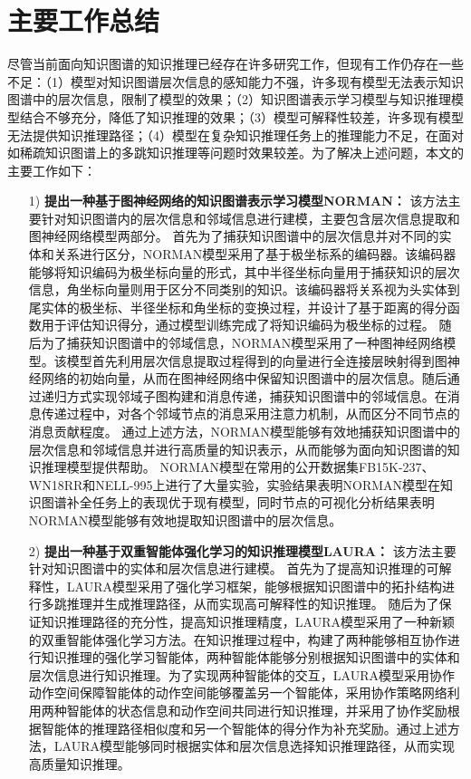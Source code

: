 \documentclass[algorithmlist, AutoFakeBold, AutoFakeSlant, figurelist, tablelist, nomlist, engineering, openany]{seuthesix} %
\begin{document}
\section{主要工作总结}
尽管当前面向知识图谱的知识推理已经存在许多研究工作，但现有工作仍存在一些不足：（1）模型对知识图谱层次信息的感知能力不强，许多现有模型无法表示知识图谱中的层次信息，限制了模型的效果；（2）知识图谱表示学习模型与知识推理模型结合不够充分，降低了知识推理的效果；（3）模型可解释性较差，许多现有模型无法提供知识推理路径；（4）模型在复杂知识推理任务上的推理能力不足，在面对如稀疏知识图谱上的多跳知识推理等问题时效果较差。为了解决上述问题，本文的主要工作如下：
\begin{itemize}
  \item [1)]\textbf{提出一种基于图神经网络的知识图谱表示学习模型NORMAN：}
  该方法主要针对知识图谱内的层次信息和邻域信息进行建模，主要包含层次信息提取和图神经网络模型两部分。
  首先为了捕获知识图谱中的层次信息并对不同的实体和关系进行区分，NORMAN模型采用了基于极坐标系的编码器。该编码器能够将知识编码为极坐标向量的形式，其中半径坐标向量用于捕获知识的层次信息，角坐标向量则用于区分不同类别的知识。该编码器将关系视为头实体到尾实体的极坐标、半径坐标和角坐标的变换过程，并设计了基于距离的得分函数用于评估知识得分，通过模型训练完成了将知识编码为极坐标的过程。
  随后为了捕获知识图谱中的邻域信息，NORMAN模型采用了一种图神经网络模型。该模型首先利用层次信息提取过程得到的向量进行全连接层映射得到图神经网络的初始向量，从而在图神经网络中保留知识图谱中的层次信息。随后通过递归方式实现邻域子图构建和消息传递，捕获知识图谱中的邻域信息。在消息传递过程中，对各个邻域节点的消息采用注意力机制，从而区分不同节点的消息贡献程度。
  通过上述方法，NORMAN模型能够有效地捕获知识图谱中的层次信息和邻域信息并进行高质量的知识表示，从而能够为面向知识图谱的知识推理模型提供帮助。
  NORMAN模型在常用的公开数据集FB15K-237、WN18RR和NELL-995上进行了大量实验，实验结果表明NORMAN模型在知识图谱补全任务上的表现优于现有模型，同时节点的可视化分析结果表明NORMAN模型能够有效地提取知识图谱中的层次信息。
  \item [2)]\textbf{提出一种基于双重智能体强化学习的知识推理模型LAURA：}
  该方法主要针对知识图谱中的实体和层次信息进行建模。
  首先为了提高知识推理的可解释性，LAURA模型采用了强化学习框架，能够根据知识图谱中的拓扑结构进行多跳推理并生成推理路径，从而实现高可解释性的知识推理。
  随后为了保证知识推理路径的充分性，提高知识推理精度，LAURA模型采用了一种新颖的双重智能体强化学习方法。在知识推理过程中，构建了两种能够相互协作进行知识推理的强化学习智能体，两种智能体能够分别根据知识图谱中的实体和层次信息进行知识推理。为了实现两种智能体的交互，LAURA模型采用协作动作空间保障智能体的动作空间能够覆盖另一个智能体，采用协作策略网络利用两种智能体的状态信息和动作空间共同进行知识推理，并采用了协作奖励根据智能体的推理路径相似度和另一个智能体的得分作为补充奖励。通过上述方法，LAURA模型能够同时根据实体和层次信息选择知识推理路径，从而实现高质量知识推理。

\end{itemize}
\end{document}
